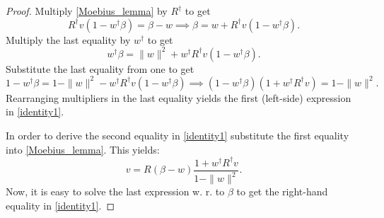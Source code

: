 \documentclass[10pt,a4paper]{amsart}
\begin{document}
\begin{proof}
Multiply \eqref{Moebius_lemma} by $R^\dagger$ to get
\begin{equation}
\label{expr_lemma}
R^\dagger v (1 - w^\dagger \beta) = \beta - w \implies \beta = w + R^\dagger v (1 - w^\dagger \beta).
\end{equation}
Multiply the last equality by $w^\dagger$ to get
$$
w^\dagger \beta = \| w \|^2 + w^\dagger R^\dagger v (1 - w^\dagger \beta).
$$
Substitute the last equality from one to get
$$
1 - w^\dagger \beta = 1 - \|w\|^2 - w^\dagger R^\dagger v (1 - w^\dagger \beta) \implies (1 - w^\dagger \beta) (1 + w^\dagger R^\dagger v) = 1 - \|w\|^2.
$$
Rearranging multipliers in the last equality yields the first (left-side) expression in \eqref{identity1}.

In order to derive the second equality in \eqref{identity1} substitute the first equality into \eqref{Moebius_lemma}. This yields:
$$
v = R (\beta - w) \frac{1 + w^\dagger R^\dagger v}{1 - \| w \|^2}.
$$
Now, it is easy to solve the last expression w. r. to $\beta$ to get the right-hand equality in \eqref{identity1}.

\end{proof}
\end{document}
